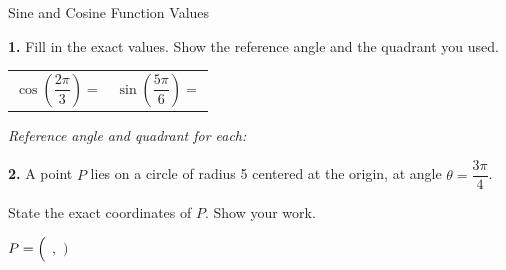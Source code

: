 \documentclass[10pt]{article}
\begin{document}
\namedateperiod

\vspace{0.16in}

\begin{notesbox}{Sine and Cosine Function Values}

\textbf{1.} Fill in the exact values. Show the reference angle and the quadrant you used.

\vspace{0.1in}
\begin{tabularx}{\linewidth}{@{} X X @{}}
$\cos\!\left(\dfrac{2\pi}{3}\right) = $ \underline{\hspace{2.2cm}} &
$\sin\!\left(\dfrac{5\pi}{6}\right) = $ \underline{\hspace{2.2cm}} \\[1em]
\end{tabularx}

\textit{Reference angle and quadrant for each:}

\vspace{1.1in}

\textbf{2.} A point $P$ lies on a circle of radius 5 centered at the origin, at angle
$\theta = \dfrac{3\pi}{4}$.

State the exact coordinates of $P$. Show your work.

\vspace{1.1in}

$P = \Bigl($ \underline{\hspace{2.2cm}} $,$ \underline{\hspace{2.2cm}} $\Bigr)$

\end{notesbox}
\end{document}
